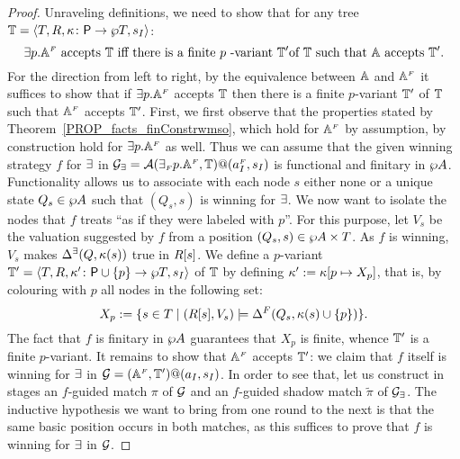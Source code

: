 \begin{proof}
Unraveling definitions, we need to show that for any tree $\mathbb{T} = \langle{T,R,\kappa\colon
\mathsf{P}\to \wp T,s_I}\rangle$:
$${{\exists} p}.\mathbb{A}^{{\scriptscriptstyle F}} \text{ accepts } \mathbb{T} \text{ iff } \text{there is a
finite }p \text{ -variant }\mathbb{T}' \text{of } \mathbb{T} \text{  such that } \mathbb{A} 
\text{  accepts } \mathbb{T}'.
$$
For the direction from left to right, by the equivalence between $\mathbb{A}$ and 
$\mathbb{A}^{{\scriptscriptstyle F}}$ it suffices to show that if ${{\exists} p}.\mathbb{A}^{{\scriptscriptstyle F}}$ accepts
$\mathbb{T}$ then there is a finite $p$-variant $\mathbb{T}'$ of $\mathbb{T}$ such that 
$\mathbb{A}^{{\scriptscriptstyle F}}$ accepts $\mathbb{T}'$. 
First, we first observe that the properties stated by 
Theorem~\ref{PROP_facts_finConstrwmso}, which hold for $\mathbb{A}^{{\scriptscriptstyle F}}$ by 
assumption, by construction hold for ${{\exists} p}.\mathbb{A}^{{\scriptscriptstyle F}}$ as well. 
Thus we can assume that the given winning strategy $f$ for $\exists$ in 
$\mathcal{G_{\exists}} = \mathcal{A}({\exists_{{\scriptscriptstyle F}} p}.\mathbb{A}^{{\scriptscriptstyle F}},\mathbb{T})@(a_I^{{\scriptscriptstyle F}},s_I)$ 
is functional and finitary in $\wp A$. 
Functionality allows us to associate with each node $s$ either none or a unique 
state $Q_s \in \wp A$ such that $(Q_s,s)$ is winning for $\exists$. 
We now want to isolate the nodes that $f$ treats ``as if they were labeled with 
$p$''. 
For this purpose, let $V_{s}$ be the valuation suggested by $f$ from a position
$(Q_s,s) \in \wp A \times T$. As $f$ is winning, $V_{s}$ makes 
$\Delta^\exists(Q,\kappa(s))$ true in $R[s]$. 
We define a $p$-variant $\mathbb{T}' = \langle{T,R,\kappa' \colon \mathsf{P}\cup\{p\} \to \wp T,s_I}\rangle$
of $\mathbb{T}$ by defining $\kappa' \mathrel{:=} \kappa[p \mapsto X_{p}]$, that is, 
by colouring with $p$ all nodes in the following set:
\begin{equation}\label{eq:X_p}
X_p \mathrel{:=} \{s \in T\mid (R[s],V_{s}) \models 
\Delta^{F}(Q_s,\kappa(s)\cup\{p\})\}.
\end{equation}
The fact that $f$ is finitary in $\wp A$ guarantees that $X_p$ is finite, whence 
$\mathbb{T}'$ is a finite $p$-variant.
It remains to show that $\mathbb{A}^{{\scriptscriptstyle F}}$ accepts $\mathbb{T}'$: we claim that $f$ itself
is winning for $\exists$ in $\mathcal{G} = (\mathbb{A}^{{\scriptscriptstyle F}},\mathbb{T}')@(a_I,s_I)$. 
In order to see that, let us construct in stages an $f$-guided match $\pi$ 
of $\mathcal{G}$ and an $f$-guided shadow match $\tilde{\pi}$ of $\mathcal{G_{\exists}}$.
The inductive hypothesis we want to bring from one round to the next is that the 
same basic position occurs in both matches, as this suffices to prove that $f$ 
is winning for $\exists$ in $\mathcal{G}$.


\end{proof}
